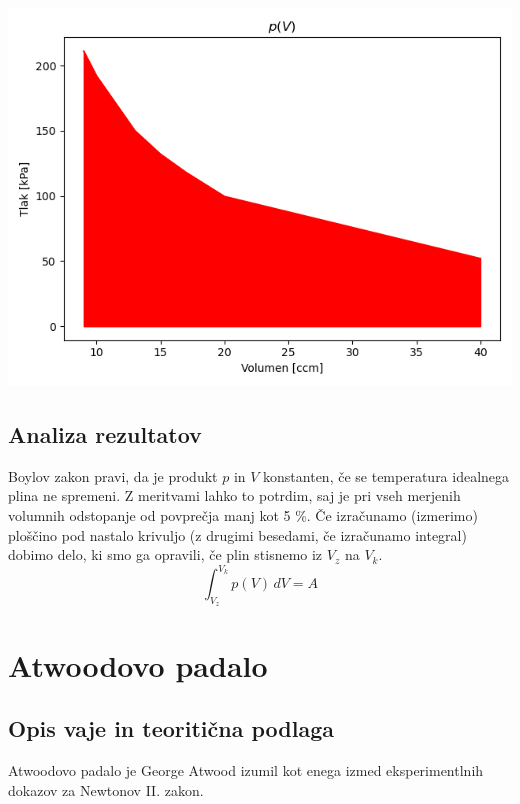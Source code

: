 \documentclass[12pt]{article}
\begin{document}
	\includegraphics[width=\linewidth]{slike/graf_v4_1.png}

	\subsection*{Analiza rezultatov}
	Boylov zakon pravi, da je produkt $p$ in $V$ konstanten, če se temperatura idealnega
	plina ne spremeni. Z meritvami lahko to potrdim, saj je pri vseh merjenih volumnih
	odstopanje od povprečja manj kot 5  \%. Če izračunamo (izmerimo) ploščino pod nastalo
	krivuljo (z drugimi besedami, če izračunamo integral) dobimo delo, ki smo ga opravili,
	če plin stisnemo iz $V_z$ na $V_k$.
	\begin{equation}
		\int_{V_z}^{V_k} p(V) \, dV = A
	\end{equation}

\newpage
\section{Atwoodovo padalo}
	\subsection*{Opis vaje in teoritična podlaga}
	Atwoodovo padalo je George Atwood izumil kot enega izmed eksperimentlnih dokazov za
	Newtonov II. zakon. \newline
	
\end{document}
